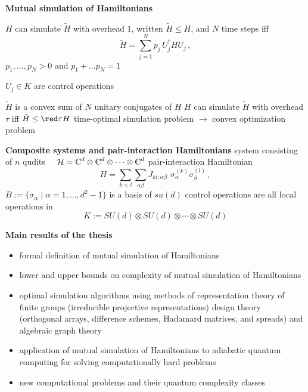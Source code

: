 \documentclass[portrait]{seminar}
\begin{document}
\begin{slide}
{\large {\bf Mutual simulation of Hamiltonians}} 

\vfill
{\blue $H$ can simulate $\tilde{H}$ with overhead $1$}, written
$\tilde{H}\le H$, and {\blue $N$ time steps} iff
\[
\tilde{H}=\sum_{j=1}^N p_j\, U_j^\dagger H U_j\,,
\]
$p_1,\ldots,p_N>0$ and $p_1+\ldots p_N=1$

$U_j\in K$ are control operations
\medskip

{\blue $\tilde{H}$ is a convex sum of $N$ unitary conjugates of $H$}
\vfill
$H$ can simulate $\tilde{H}$ with overhead {\red $\tau$} iff 
$\tilde{H} \le {\red \tau} H$ 
\vfill 
{\red time-optimal simulation} problem $\longrightarrow$
{\red convex optimization} problem 
\vfill
\end{slide}

\begin{slide}
{\large {\bf Composite systems and pair-interaction Hamiltonians}}
\vfill
system consisting of {\blue $n$ qudits}  
$\quad {\cal H}=\C^d\otimes\C^d\otimes\cdots\otimes\C^d$ 
\vfill
{\blue pair-interaction Hamiltonian}
\[
H = 
\sum_{k<l} \sum_{\alpha\beta} J_{kl;\alpha\beta} \,\,
\sigma_\alpha^{(k)}\sigma_\beta^{(l)}\,,
\]
$B:=\{\sigma_\alpha\mid\alpha=1,\ldots,d^2-1\}$ is a basis of
$su(d)$
\vfill 
{\blue control operations} are all {\red local} operations in
\[
K:=SU(d)\otimes SU(d)\otimes\cdots\otimes SU(d)
\]
\vfill
\end{slide}




\begin{slide}
{\bf Main results of the thesis}
\vfill
\begin{itemize}
\item {\red formal definition of mutual simulation of Hamiltonians}
\item {\red lower and upper bounds on complexity} of mutual simulation
of Hamiltonians
\item {\red optimal simulation algorithms} using methods of
representation theory of finite groups (irreducible projective
representations) design theory (orthogonal arrays, difference schemes,
Hadamard matrices, and spreads) and algebraic graph theory
\item {\red application of mutual simulation of Hamiltonians to
adiabatic quantum computing} for solving computationally hard problems
\item {\red new computational problems and their quantum complexity}
classes
\end{itemize}
\vfill
\end{slide}
\end{document}
